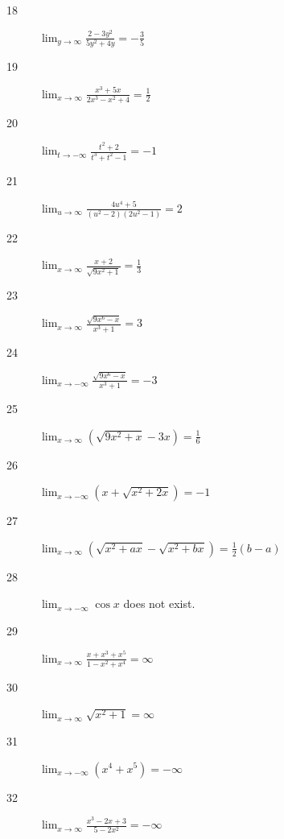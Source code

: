 \documentclass[letterpaper, landscape]{exam}
\begin{document}
\begin{description}
      \item[18] 
        $\lim_{y \to \infty} \frac{2 - 3y^2}{5y^2 + 4y} = \boxed{ - \frac{3}{5} }$

      \item[19] 
        $\lim_{x \to \infty} \frac{x^3 + 5x}{2x^3 - x^2 + 4} = \boxed{ \frac{1}{2} }$

      \item[20] 
        $\lim_{t \to -\infty} \frac{t^2 + 2}{t^3 + t^2 - 1} = \boxed{ -1 }$

      \item[21] 
        $\lim_{u \to \infty} \frac{4u^4 + 5}{\left(u^2 - 2 \right) \left(2u^2 - 1 \right)} 
          = \boxed{ 2 }$

      \item[22] 
        $\lim_{x \to \infty} \frac{x + 2}{\sqrt{9x^2 + 1}} = \boxed{ \frac{1}{3} }$

      \item[23] 
        $\lim_{x \to \infty} \frac{\sqrt{9x^6 - x}}{x^3 + 1} = \boxed{ 3 }$

      \item[24] 
        $\lim_{x \to -\infty} \frac{\sqrt{9x^6 - x}}{x^3 + 1} = \boxed{ -3 }$

      \item[25] 
        $\lim_{x \to \infty} \left( \sqrt{9x^2 + x} - 3x \right) 
          = \boxed{ \frac{1}{6} }$

      \item[26] 
        $\lim_{x \to -\infty} \left( x + \sqrt{x^2 + 2x} \right) = \boxed{ -1 }$

      \item[27] 
        $\lim_{x \to \infty} \left( \sqrt{x^2 + ax} - \sqrt{x^2 + bx} \right) 
          = \boxed{ \frac{1}{2} (b - a) }$

      \item[28] 
        $\lim_{x \to -\infty} \cos x$ does not exist.

      \item[29] 
        $\lim_{x \to \infty} \frac{x + x^3 + x^5}{1 - x^2 + x^4} = \boxed{ \infty }$

      \item[30] 
        $\lim_{x \to \infty} \sqrt{x^2 + 1} = \boxed{ \infty }$

      \item[31] 
        $\lim_{x \to -\infty} \left( x^4 + x^5 \right) = \boxed{ -\infty }$

      \item[32] 
        $\lim_{x \to \infty} \frac{x^3 - 2x + 3}{5 - 2x^2} = \boxed{ -\infty }$


\end{description}
\end{document}
